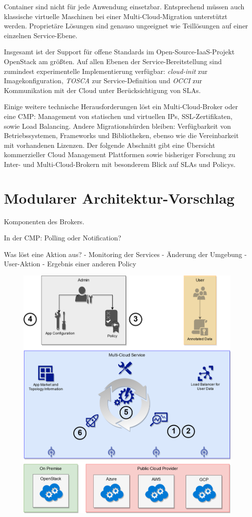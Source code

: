 \noindent
Container sind nicht für jede Anwendung einsetzbar. Entsprechend müssen auch klassische virtuelle Maschinen bei einer Multi-Cloud-Migration unterstützt werden. Proprietäre Lösungen sind genauso ungeeignet wie Teillösungen auf einer einzelnen Service-Ebene.

Insgesamt ist der Support für offene Standards im Open-Source-IaaS-Projekt OpenStack am größten. Auf allen Ebenen der Service-Bereitstellung sind zumindest experimentelle Implementierung verfügbar: \emph{cloud-init} zur Imagekonfiguration, \emph{TOSCA} zur Service-Definition und \emph{OCCI} zur Kommunikation mit der Cloud unter Berücksichtigung von SLAs. 

Einige weitere technische Herausforderungen löst ein Multi-Cloud-Broker oder eine CMP: Management von statischen und virtuellen IPs, SSL-Zertifikaten, sowie Load Balancing. Andere Migrationshürden bleiben: Verfügbarkeit von Betriebssystemen, Frameworks und Bibliotheken, ebenso wie die Vereinbarkeit mit vorhandenen Lizenzen. Der folgende Abschnitt gibt eine Übersicht kommerzieller Cloud Management Plattformen sowie bisheriger Forschung zu Inter- und Multi-Cloud-Brokern mit besonderem Blick auf SLAs und Policys. 

\section{Modularer Architektur-Vorschlag}

Komponenten des Brokers.


In der CMP: Polling oder Notification?

Was löst eine Aktion aus?
- Monitoring der Services
- Änderung der Umgebung
- User-Aktion
- Ergebnis einer anderen Policy

\begin{figure}
	\centering
	\includegraphics[width=0.9\linewidth]{images/cycle}
	\caption{}
	\label{fig:Chicken1}
\end{figure}

